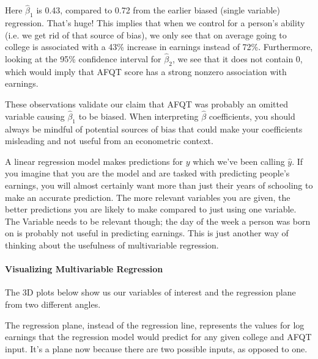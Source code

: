\documentclass[letterpaper,10pt,english]{jupyterBook}
\begin{document}
\sphinxAtStartPar
Here \(\hat{\beta}_1\) is 0.43, compared to 0.72 from the earlier biased (single variable) regression. That’s huge! This implies that when we control for a person’s ability (i.e. we get rid of that source of bias), we only see that on average going to college is associated with a 43\% increase in earnings instead of 72\%. Furthermore, looking at the 95\% confidence interval for \(\hat{\beta}_2\), we see that it does not contain 0, which would imply that AFQT score has a strong non\sphinxhyphen{}zero association with earnings.

\sphinxAtStartPar
These observations validate our claim that AFQT was probably an omitted variable causing \(\hat{\beta}_1\) to be biased. When interpreting \(\hat{\beta}\) coefficients, you should always be mindful of potential sources of bias that could make your coefficients misleading and not useful from an econometric context.

\sphinxAtStartPar
{} A linear regression model makes predictions for \(y\) which we’ve been calling \(\hat{y}\). If you imagine that you are the model and are tasked with predicting people’s earnings, you will almost certainly want more than just their years of schooling to make an accurate prediction. The more relevant variables you are given, the better predictions you are likely to make compared to just using one variable. The Variable needs to be relevant though; the day of the week a person was born on is probably not useful in predicting earnings. This is just another way of thinking about the usefulness of multivariable regression.


\paragraph{Visualizing Multivariable Regression}
\label{\detokenize{content/11-econometrics/multivariable:visualizing-multivariable-regression}}
\sphinxAtStartPar
The 3D plots below show us our variables of interest and the regression plane from two different angles.

\noindent{}

\noindent{}

\noindent{}

\sphinxAtStartPar
The regression plane, instead of the regression line, represents the values for log earnings that the regression model would predict for any given college and AFQT input. It’s a plane now because there are two possible inputs, as opposed to one.
\end{document}
